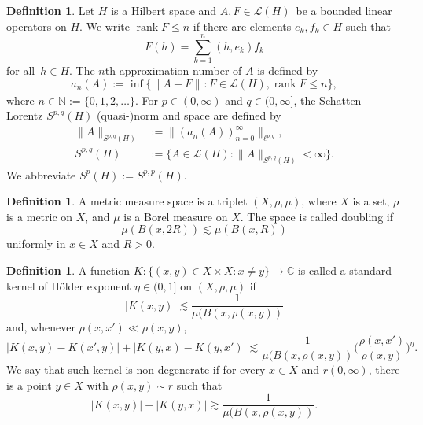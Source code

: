\documentclass[reqno]{amsart}
\newcommand{\abs}[1]{|#1|}
\newcommand{\Norm}[2]{\|#1\|_{#2}}
\newcommand{\bddlin}[0]{\mathscr{L}}
\newcommand{\C}{\mathbb{C}}
\newcommand{\N}{\mathbb{N}}
\theoremstyle{plain}
\theoremstyle{definition}
\newtheorem{definition}[equation]{Definition}
\theoremstyle{remark}
\begin{document}
\begin{definition}\label{def:Spq}
Let $H$ is a Hilbert space and $A,F\in\bddlin(H)$ be a bounded linear operators on $H$.
We write $\operatorname{rank}F\leq n$ if there are elements $e_k,f_k\in H$ such that
\begin{equation*}
  F(h)=\sum_{k=1}^n (h,e_k)f_k
\end{equation*}
for all $h\in H$. The $n$th approximation number of $A$ is defined by
\begin{equation*}
  a_n(A):=\inf\{\Norm{A-F}{}:F\in\bddlin(H),\operatorname{rank}F\leq n\},
\end{equation*}
where $n\in\N:=\{0,1,2,\ldots\}$. For $p\in(0,\infty)$ and $q\in(0,\infty]$, the Schatten--Lorentz $S^{p,q}(H)$ (quasi-)norm and space are defined by
\begin{equation*}
\begin{split}
  \Norm{A}{S^{p,q}(H)} &:=\Norm{(a_n(A))_{n=0}^\infty}{\ell^{p,q}}, \\
   S^{p,q}(H) &:=\{A\in\bddlin(H):\Norm{A}{S^{p,q}(H)}<\infty\}.
\end{split}
\end{equation*}
We abbreviate $S^p(H):=S^{p,p}(H)$.
\end{definition}


\begin{definition}\label{def:metric}
A metric measure space is a triplet $(X,\rho,\mu)$, where $X$ is a set, $\rho$ is a metric on $X$, and $\mu$ is a Borel measure on $X$. The space is called doubling if
\begin{equation*}
  \mu(B(x,2R))\lesssim\mu(B(x,R))
\end{equation*}
uniformly in $x\in X$ and $R>0$.
\end{definition}


\begin{definition}\label{def:CZK}
A function $K:\{(x,y)\in X\times X: x\neq y\}\to\C$ is called a standard kernel of H\"older exponent $\eta\in(0,1]$ on $(X,\rho,\mu)$ if
\begin{equation*}
  \abs{K(x,y)}\lesssim\frac{1}{\mu(B(x,\rho(x,y))}
\end{equation*}
and, whenever $\rho(x,x')\ll\rho(x,y)$,
\begin{equation*}
  \abs{K(x,y)-K(x',y)}
  +\abs{K(y,x)-K(y,x')}
  \lesssim\frac{1}{\mu(B(x,\rho(x,y))}\Big(\frac{\rho(x,x')}{\rho(x,y)}\Big)^\eta.
\end{equation*}
We say that such kernel is non-degenerate if for every $x\in X$ and $r(0,\infty)$, there is a point $y\in X$ with $\rho(x,y)\sim r$ such that
\begin{equation*}
  \abs{K(x,y)}+\abs{K(y,x)}\gtrsim\frac{1}{\mu(B(x,\rho(x,y))}.
\end{equation*}
\end{definition}
\end{document}
